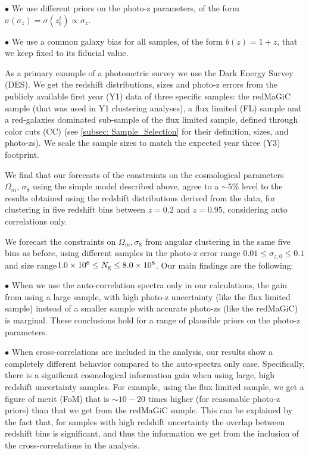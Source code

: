 \documentclass[a4paper,fleqn,usenatbib]{mnras}
\begin{document}
$\bullet$ We use different priors on the photo-z parameters, of the form $\sigma(\sigma_z) = \sigma(z_b^i) \propto \sigma_z$.

$\bullet$ We use a common galaxy bias for all samples, of the form $b(z) = 1+ z$, that we keep fixed to its fiducial value. 


As a primary example of a photometric survey we use the Dark Energy Survey (DES). We get the redshift distributions, sizes and photo-z errors from the publicly available first year (Y1) data of three specific samples: the redMaGiC sample (that was used in Y1 clustering analyses), a flux limited (FL) sample and a red-galaxies dominated sub-sample of the flux limited sample, defined through color cuts (CC) (see \ref{subsec: Sample_Selection} for their definition, sizes, and photo-zs). We scale the sample sizes to match the expected year three (Y3) footprint. 

We find that our forecasts of the constraints on the cosmological parameters $\Omega_m,\, \sigma_8$ using the simple model described above, agree to a $\sim 5 \%$ level to the results obtained using the redshift distributions derived from the data, for clustering in five redshift bins between $z = 0.2$ and $z = 0.95$, considering auto correlations only.

We forecast the constraints on $\Omega_m, \sigma_8$ from angular clustering in the same five bins as before, using different samples in the photo-z error range $0.01 \leq \sigma_{z,0} \leq 0.1$ and size range$1.0 \times 10^6 \leq N_{\mbox{\scriptsize{g}}} \leq 8.0 \times 10^8$. Our main findings are the following:

$\bullet$ When we use the auto-correlation spectra only in our calculations, the gain from using a large sample, with high photo-z uncertainty (like the flux limited sample) instead of a smaller sample with accurate photo-zs (like the redMaGiC) is marginal. These conclusions hold for a range of plausible priors on the photo-z parameters.

$\bullet$ When cross-correlations are included in the analysis, our results show a completely different behavior compared to the auto-spectra only case. Specifically, there is a significant cosmological information gain when using large, high redshift uncertainty samples. For example, using the flux limited sample, we get a figure of merit (FoM) that is $\sim 10 - 20$ times higher (for reasonable photo-z priors) than that we get from the redMaGiC sample. This can be explained by the fact that, for samples with high redshift uncertainty the overlap between redshift bins is significant, and thus the information we get from the inclusion of the cross-correlations in the analysis.
\end{document}
